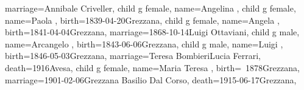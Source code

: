 \documentclass{article}
\begin{document}
\begin{midpage}
\begin{center}
\begin{genealogypicture}
{{{{{{{{{{{                                            marriage={Annibale Criveller}{},
                                        }
                                    }
                                    child{
                                        g{
                                            female,
                                            name={Angelina },
                                        }
                                    }
                                }
                                child{
                                    g{
                                        female,
                                        name={Paola },
                                        birth={1839-04-20}{Grezzana},
                                    }
                                }
                                child{
                                    g{
                                        female,
                                        name={Angela },
                                        birth={1841-04-04}{Grezzana},
                                        marriage={1868-10-14}{Luigi Ottaviani},
                                    }
                                }
                                child{
                                    g{
                                        male,
                                        name={Arcangelo },
                                        birth={1843-06-06}{Grezzana},
                                    }
                                }
                                child{
                                    g{
                                        male,
                                        name={Luigi },
                                        birth={1846-05-03}{Grezzana},
                                        marriage={Teresa Bombieri}{Lucia Ferrari},
                                        death={1916}{Avesa},
                                    }
                                    child{
                                        g{
                                            female,
                                            name={Maria Teresa },
                                            birth={~1878}{Grezzana},
                                            marriage={1901-02-06}{Grezzana \newline Basilio Dal Corso},
                                            death={1915-06-17}{Grezzana},
                                        }
                                    }
}}}}}}}}}
\end{genealogypicture}
\end{center}
\end{midpage}
\end{document}
